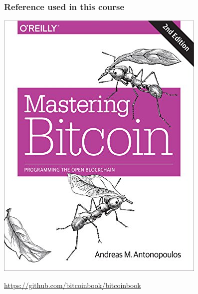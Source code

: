 \documentclass[11pt]{beamer}  %
\begin{document}
\begin{frame}\frametitle{Reference used in this course}

  \begin{center}
    \includegraphics[scale=.35,clip=false]{pictures/mastering-bitcoin.jpg}
  \end{center}

  \url{https://github.com/bitcoinbook/bitcoinbook}

\end{frame}
\end{document}
